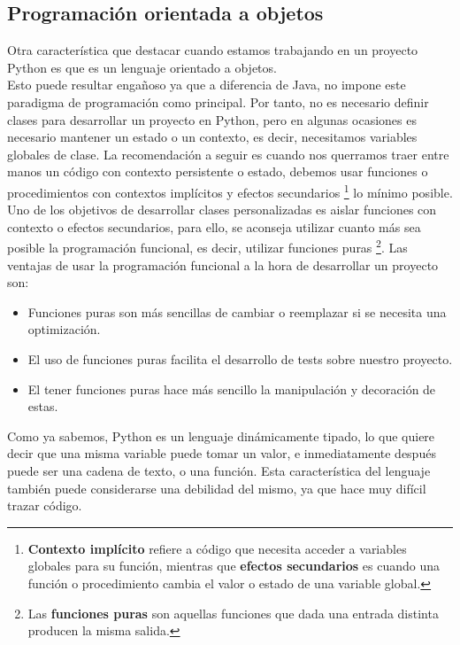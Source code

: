 \subsection*{Programación orientada a objetos}
Otra característica que destacar cuando estamos trabajando en un proyecto Python es que es un lenguaje orientado a objetos. \\
Esto puede resultar engañoso ya que a diferencia de Java, no impone este paradigma de programación como principal. Por tanto, no es necesario definir clases para desarrollar un proyecto en Python, pero en algunas ocasiones es necesario mantener un estado o un contexto, es decir, necesitamos variables globales de clase. La recomendación a seguir es cuando nos querramos traer entre manos un código con contexto persistente o estado, debemos usar funciones o procedimientos con contextos implícitos y efectos secundarios \footnote{\textbf{Contexto implícito} refiere a código que necesita acceder a variables globales para su función, mientras que \textbf{efectos secundarios} es cuando una función o procedimiento cambia el valor  o estado de una variable global. } lo mínimo posible. Uno de los objetivos de desarrollar clases personalizadas es aislar funciones con contexto o efectos secundarios, para ello, se aconseja utilizar cuanto más sea posible la programación funcional, es decir, utilizar funciones puras \footnote{Las \textbf{funciones puras} son aquellas funciones que dada una entrada distinta producen la misma salida.}. Las ventajas de usar la programación funcional  a la hora de desarrollar un proyecto son:
\begin{itemize}
    \item Funciones puras son más sencillas de cambiar o reemplazar si se necesita una optimización.
    \item El uso de funciones puras facilita el desarrollo de tests sobre nuestro proyecto.
    \item El tener funciones puras hace más sencillo la manipulación y decoración de estas.
\end{itemize}
Como ya sabemos, Python es un lenguaje dinámicamente tipado, lo que quiere decir que una misma variable puede tomar un valor, e inmediatamente después puede ser una cadena de texto, o una función. Esta característica del lenguaje también puede considerarse una debilidad del mismo, ya que hace muy difícil trazar código.\\

